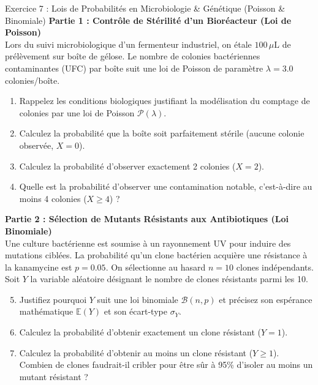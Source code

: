 \documentclass[11pt,a4paper]{article}
\begin{document}
\begin{exercicebox}{Exercice 7 : Lois de Probabilités en Microbiologie \& Génétique (Poisson \& Binomiale)}
\textbf{Partie 1 : Contrôle de Stérilité d'un Bioréacteur (Loi de Poisson)} \\
Lors du suivi microbiologique d'un fermenteur industriel, on étale $100\,\mu\text{L}$ de prélèvement sur boîte de gélose. Le nombre de colonies bactériennes contaminantes (UFC) par boîte suit une loi de Poisson de paramètre $\lambda = 3.0$ colonies/boîte.
\begin{enumerate}[label=\textbf{\alph*.}]
  \item Rappelez les conditions biologiques justifiant la modélisation du comptage de colonies par une loi de Poisson $\mathcal{P}(\lambda)$.
  \item Calculez la probabilité que la boîte soit parfaitement stérile (aucune colonie observée, $X = 0$).
  \item Calculez la probabilité d'observer exactement 2 colonies ($X = 2$).
  \item Quelle est la probabilité d'observer une contamination notable, c'est-à-dire au moins 4 colonies ($X \ge 4$) ?
\end{enumerate}

\vspace{2mm}
\textbf{Partie 2 : Sélection de Mutants Résistants aux Antibiotiques (Loi Binomiale)} \\
Une culture bactérienne est soumise à un rayonnement UV pour induire des mutations ciblées. La probabilité qu'un clone bactérien acquière une résistance à la kanamycine est $p = 0.05$. On sélectionne au hasard $n = 10$ clones indépendants. Soit $Y$ la variable aléatoire désignant le nombre de clones résistants parmi les 10.
\begin{enumerate}[label=\textbf{\alph*.}]
  \setcounter{enumi}{4}
  \item Justifiez pourquoi $Y$ suit une loi binomiale $\mathcal{B}(n, p)$ et précisez son espérance mathématique $\mathbb{E}(Y)$ et son écart-type $\sigma_Y$.
  \item Calculez la probabilité d'obtenir exactement un clone résistant ($Y = 1$).
  \item Calculez la probabilité d'obtenir au moins un clone résistant ($Y \ge 1$). Combien de clones faudrait-il cribler pour être sûr à 95\% d'isoler au moins un mutant résistant ?
\end{enumerate}
\end{exercicebox}
\end{document}
